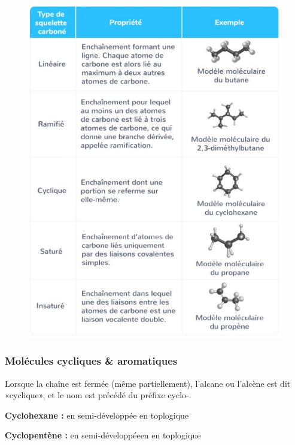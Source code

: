 \documentclass[11pt,a4paper]{article}
\begin{document}
\begin{figure}[h]
    \centering
    \includegraphics[width=0.75\linewidth]{imgs/c5/structures.jpg}
\end{figure}
\subsubsection{Molécules cycliques \& aromatiques}
Lorsque la chaîne est fermée (même partiellement), l’alcane ou l’alcène est dit «cyclique», et le nom est précédé du préfixe cyclo-. 

\begin{eg}

\textbf{Cyclohexane : } en semi-développée
\quad \quad en toplogique
\chemfig{
    -[:180]%
    -[:240]%
    -[:300]%
          -%
     -[:60]%
              (
        -[:120]%
              )
}
\vspace{1cm}

\textbf{Cyclopentène : } en semi-développéeen
 \quad \quad en toplogique
\chemfig{
     -[:180]%
     -[:252]%
    =^[:324]%
      -[:36]%
               (
         -[:108]%
               )
}


\end{eg}
\end{document}
